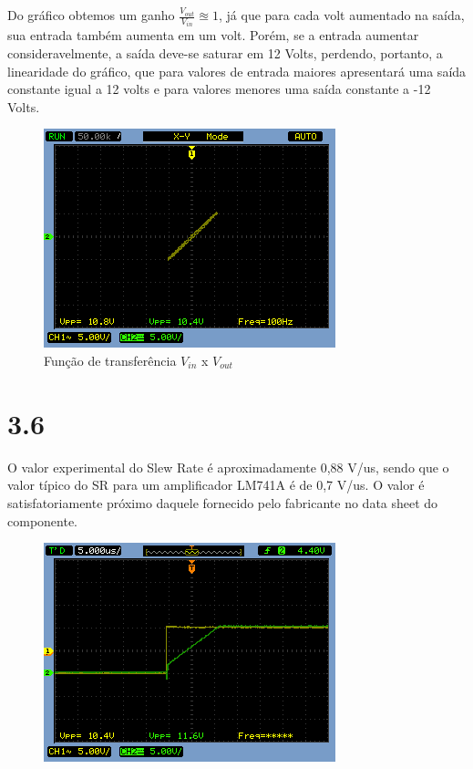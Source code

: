 \documentclass[brazil]{article}
\begin{document}
Do gráfico obtemos um ganho $\frac{V_{out}}{V_{in}}\approxeq 1$, já que para cada volt aumentado na saída, sua entrada também aumenta em um volt.
Porém, se a entrada aumentar consideravelmente, a saída deve-se saturar em 12 Volts, perdendo, portanto, a linearidade do gráfico, que para valores de entrada maiores apresentará uma saída constante igual a 12 volts e para valores menores uma saída constante a -12 Volts.

\begin{figure}[H]
\begin{centering}
\includegraphics[scale=0.5]{figuras/35xy}
\par\end{centering}
\caption{Função de transferência $V_{in}$ x $V_{out}$ \label{3.5}}
\end{figure}



\section*{3.6}
O valor experimental do Slew Rate é aproximadamente 0,88 V/us, sendo que o valor típico do SR para um amplificador LM741A é de 0,7 V/us. O valor é satisfatoriamente próximo daquele fornecido pelo fabricante no data sheet do componente. 


\begin{figure}[H]
\begin{centering}
\includegraphics[scale=0.5]{figuras/36}
\par\end{centering}
\caption{}
\end{figure}
\end{document}

